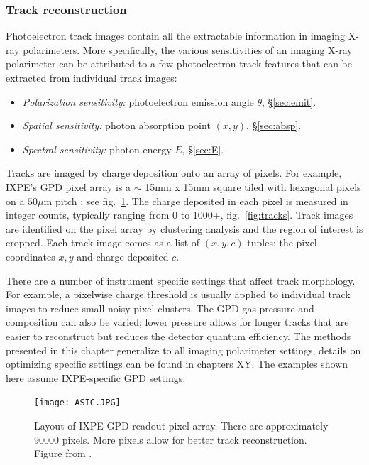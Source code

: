 \subsubsection{Track reconstruction}
\label{sec:trckrec}
Photoelectron track images contain all the extractable information in imaging X-ray polarimeters. More specifically, the various sensitivities of an imaging X-ray polarimeter can be attributed to a few photoelectron track features that can be extracted from individual track images:
\begin{itemize}
    \item \textit{Polarization sensitivity:} photoelectron emission angle $\theta$, \S\ref{sec:emit}.
    \item \textit{Spatial sensitivity:} photon absorption point $(x,y)$, \S\ref{sec:absp}.
    \item \textit{Spectral sensitivity:} photon energy $E$, \S\ref{sec:E}.
\end{itemize}
Tracks are imaged by charge deposition onto an array of pixels. For example, IXPE's GPD pixel array is a $\sim$ 15mm x 15mm square tiled with hexagonal pixels on a $50\mu$m pitch \citep{baldini_design_2021}; see fig.~\ref{fig:pix}. The charge deposited in each pixel is measured in integer counts, typically ranging from 0 to 1000+, fig.~\ref{fig:tracks}. Track images are identified on the pixel array by clustering analysis and the region of interest is cropped. Each track image comes as a list of $(x,y,c)$ tuples: the pixel coordinates $x,y$ and charge deposited $c$. 

There are a number of instrument specific settings that affect track morphology. For example, a pixelwise charge threshold is usually applied to individual track images to reduce small noisy pixel clusters. The GPD gas pressure and composition can also be varied; lower pressure allows for longer tracks that are easier to reconstruct but reduces the detector quantum efficiency. The methods presented in this chapter generalize to all imaging polarimeter settings, details on optimizing specific settings can be found in chapters XY. The examples shown here assume IXPE-specific GPD settings.

\begin{figure}[t]
\centering
\texttt{[image: ASIC.JPG]}
\caption{Layout of IXPE GPD readout pixel array. There are approximately 90000 pixels. More pixels allow for better track reconstruction. Figure from \citet{bellazzini_novel_2003}.}
\label{fig:pix}       %
\end{figure}

